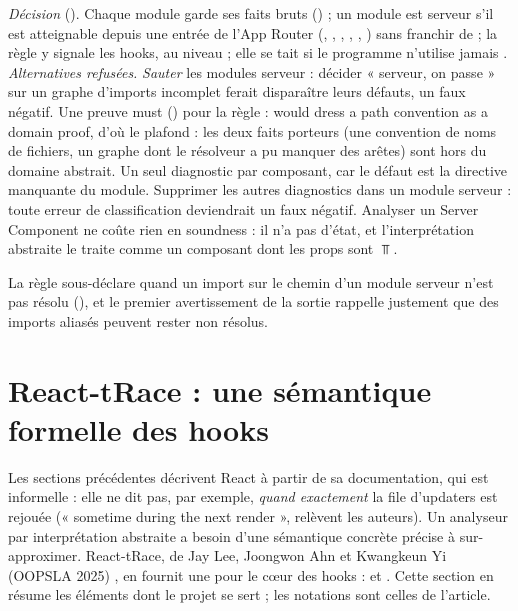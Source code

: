 \begin{decision}
\emph{Décision} (). Chaque module garde ses faits bruts
() ; un module est serveur s'il est
atteignable depuis une entrée de l'App Router (, ,
, , , ) sans
franchir de  ; la règle  y
signale les hooks, au niveau \Warning{} ; elle se tait si le programme
n'utilise jamais . \emph{Alternatives refusées.}
\emph{Sauter} les modules serveur : décider « serveur, on passe » sur un graphe
d'imports incomplet ferait disparaître leurs défauts, un faux négatif. Une
preuve must () pour la règle : \og would dress a path
convention as a domain proof\fg{}, d'où le plafond \Warning{} : les deux faits porteurs (une convention de noms de fichiers, un graphe dont le résolveur a pu manquer des arêtes) sont hors du domaine abstrait. Un seul diagnostic par composant, car le défaut est la directive manquante du module. Supprimer les
autres diagnostics dans un module serveur : toute erreur de classification
deviendrait un faux négatif. Analyser un Server Component ne coûte rien en
soundness : il n'a pas d'état, et l'interprétation abstraite le traite comme
un composant dont les props sont $\Top$.
\end{decision}

La règle sous-déclare quand un import sur le chemin d'un module serveur n'est
pas résolu (), et le premier avertissement de la sortie rappelle
justement que des imports aliasés peuvent rester non résolus.

\section{React-tRace : une sémantique formelle des hooks}
\label{sec:react-modele-trace}

Les sections précédentes décrivent React à partir de sa documentation, qui est
informelle : elle ne dit pas, par exemple, \emph{quand exactement} la file
d'updaters est rejouée (« sometime during the next render », relèvent les
auteurs). Un analyseur par interprétation abstraite a besoin d'une sémantique
concrète précise à sur-approximer. React-tRace, de Jay Lee, Joongwon Ahn et
Kwangkeun Yi (OOPSLA 2025) \cite{LeeAhnYi2025}, en fournit une pour le cœur
des hooks :  et . Cette section en résume les
éléments dont le projet se sert ; les notations sont celles de l'article.

